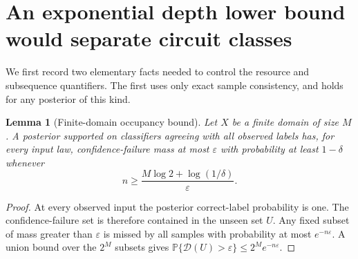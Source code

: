 \documentclass[11pt]{article}
\newtheorem{lemma}[theorem]{Lemma}
\theoremstyle{remark}
\newcommand{\Prb}{\mathbb P}
\begin{document}
\section{An exponential depth lower bound would separate circuit classes}
\label{sec:negative}

We first record two elementary facts needed to control the resource
and subsequence quantifiers. The first uses only exact sample
consistency, and holds for any posterior of this kind.

\begin{lemma}[Finite-domain occupancy bound]
\label{lem:occupancy}
Let $X$ be a finite domain of size $M$. A posterior supported on
classifiers agreeing with all observed labels has, for every input
law, confidence-failure mass at most $\varepsilon$ with probability
at least $1-\delta$ whenever
\[
 n\ge\frac{M\log2+\log(1/\delta)}{\varepsilon}.
\]
\end{lemma}
\begin{proof}
At every observed input the posterior correct-label probability is
one. The confidence-failure set is therefore contained in the unseen
set $U$. Any fixed subset of mass greater than $\varepsilon$ is
missed by all samples with probability at most $e^{-n\varepsilon}$.
A union bound over the $2^M$ subsets gives
$\Prb\{\mathcal D(U)>\varepsilon\}\le2^M e^{-n\varepsilon}$.
\end{proof}
\end{document}
